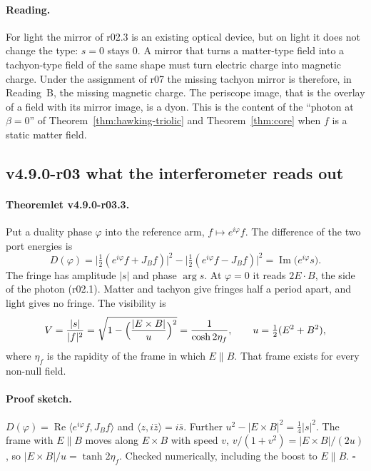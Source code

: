 \paragraph{Reading.}
For light the mirror of r02.3 is an existing optical device, but on light it does not change the type: \(s=0\) stays
\(0\).  A mirror that turns a matter-type field into a tachyon-type field of the same shape must turn electric charge into
magnetic charge.  Under the assignment of r07 the missing tachyon mirror is therefore, in Reading~B, the missing magnetic
charge.  The periscope image, that is the overlay of a field with its mirror image, is a dyon.  This is the content of the
``photon at \(\beta=0\)'' of Theorem~\ref{thm:hawking-triolic} and Theorem~\ref{thm:core} when \(f\) is a static matter
field.

\subsection*{v4.9.0-r03 what the interferometer reads out}
\label{subsec:v490-r03-readout}

\paragraph{Theoremlet v4.9.0-r03.3.}
Put a duality phase \(\varphi\) into the reference arm, \(f\mapsto e^{i\varphi}f\).  The difference of the two port
energies is
\[
D(\varphi)=\bigl|\tfrac12(e^{i\varphi}f+J_Bf)\bigr|^2-\bigl|\tfrac12(e^{i\varphi}f-J_Bf)\bigr|^2
=\operatorname{Im}\bigl(e^{i\varphi}s\bigr).
\]
The fringe has amplitude \(|s|\) and phase \(\arg s\).  At \(\varphi=0\) it reads \(2E\cdot B\), the side of the photon
(r02.1).  Matter and tachyon give fringes half a period apart, and light gives no fringe.  The visibility is
\[
V=\frac{|s|}{|f|^2}=\sqrt{1-\Bigl(\frac{|E\times B|}{u}\Bigr)^2}=\frac1{\cosh2\eta_f},
\qquad u=\tfrac12(E^2+B^2),
\]
where \(\eta_f\) is the rapidity of the frame in which \(E\parallel B\).  That frame exists for every non-null field.

\paragraph{Proof sketch.}
\(D(\varphi)=\operatorname{Re}\langle e^{i\varphi}f,J_Bf\rangle\) and \(\langle z,i\bar z\rangle=i\bar s\).  Further
\(u^2-|E\times B|^2=\tfrac14|s|^2\).  The frame with \(E\parallel B\) moves along \(E\times B\) with speed \(v\),
\(v/(1+v^2)=|E\times B|/(2u)\), so \(|E\times B|/u=\tanh2\eta_f\).  Checked numerically, including the boost to
\(E\parallel B\).  \(\square\)

